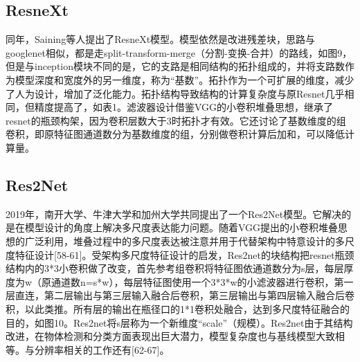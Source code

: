 \documentclass[15pt]{article}
\begin{document}
\subsection{ResneXt}
同年，Saining等人提出了ResneXt模型\cite{ref56}。模型依然是改进残差块，思路与googlenet相似，都是走split-transform-merge（分割-变换-合并）的路线，如图9，但是与inception模块不同的是，它的支路是相同结构的拓扑组成的，并将支路数作为模型深度和宽度外的另一维度，称为“基数”。拓扑作为一个可扩展的维度，减少了人为设计，增加了泛化能力。拓扑结构导致结构的计算复杂度与原Resnet几乎相同，但精度提高了，如表1。滤波器设计借鉴VGG的小卷积堆叠思想，继承了resnet的瓶颈构架，因为卷积层数大于3时拓扑才有效。它还讨论了基数维度的组卷积，即原特征图通道数分为基数维度的组，分别做卷积计算后加和，可以降低计算量。

\subsection{Res2Net}
2019年，南开大学、牛津大学和加州大学共同提出了一个Res2Net模型\cite{ref57}。它解决的是在模型设计的角度上解决多尺度表达能力问题。随着VGG提出的小卷积堆叠思想的广泛利用，堆叠过程中的多尺度表达被注意并用于代替架构中特意设计的多尺度特征设计[58-61]。受架构多尺度特征设计的启发，Res2net的块结构把resnet瓶颈结构内的3*3小卷积做了改变，首先参考组卷积\cite{ref56}将特征图依通道数分为s层，每层厚度为w（原通道数n=s*w），每层特征图使用一个3*3*w的小滤波器进行卷积，第一层直连，第二层输出与第三层输入融合后卷积，第三层输出与第四层输入融合后卷积，以此类推。所有层的输出在瓶径口的1*1卷积处融合，达到多尺度特征融合的目的，如图10。Res2net将s层称为一个新维度“scale”（规模）。Res2net由于其结构改进，在物体检测和分类方面表现出巨大潜力，模型复杂度也与基线模型大致相等。与分辨率相关的工作还有[62-67]\cite{ref77}。
\end{document}
